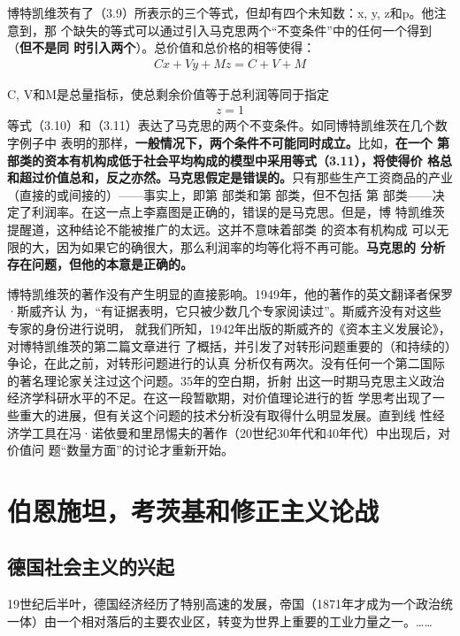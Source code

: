 博特凯维茨有了（3.9）所表示的三个等式，但却有四个未知数：x, y, z和p。他注意到，那
个缺失的等式可以通过引入马克思两个“不变条件”中的任何一个得到（\textbf{但不是同
  时引入两个}）。总价值和总价格的相等使得：
\begin{gather}
  Cx + Vy + Mz = C+V+M
\end{gather}

C, V和M是总量指标，使总剩余价值等于总利润等同于指定
\begin{gather}
  z = 1
\end{gather}
等式（3.10）和（3.11）表达了马克思的两个不变条件。如同博特凯维茨在几个数字例子中
表明的那样，\textbf{一般情况下，两个条件不可能同时成立。}比如，\textbf{在一个
  第 部类的资本有机构成低于社会平均构成的模型中采用等式（3.11），将使得价
  格总和超过价值总和，反之亦然。马克思假定是错误的。}只有那些生产工资商品的产业
（直接的或间接的）——事实上，即第 部类和第 部类，但不包括
第 部类——决定了利润率。在这一点上李嘉图是正确的，错误的是马克思。但是，博
特凯维茨提醒道，这种结论不能被推广的太远。这并不意味着部类 的资本有机构成
可以无限的大，因为如果它的确很大，那么利润率的均等化将不再可能。\textbf{马克思的
  分析存在问题，但他的本意是正确的。}

博特凯维茨的著作没有产生明显的直接影响。1949年，他的著作的英文翻译者保罗·斯威齐认
为，“有证据表明，它只被少数几个专家阅读过”。斯威齐没有对这些专家的身份进行说明，
就我们所知，1942年出版的斯威齐的《资本主义发展论》，对博特凯维茨的第二篇文章进行
了概括，并引发了对转形问题重要的（和持续的）争论，在此之前，对转形问题进行的认真
分析仅有两次。没有任何一个第二国际的著名理论家关注过这个问题。35年的空白期，折射
出这一时期马克思主义政治经济学科研水平的不足。在这一段暂歇期，对价值理论进行的哲
学思考出现了一些重大的进展，但有关这个问题的技术分析没有取得什么明显发展。直到线
性经济学工具在冯·诺依曼和里昂惕夫的著作（20世纪30年代和40年代）中出现后，对价值问
题“数量方面”的讨论才重新开始。

\chapter{伯恩施坦，考茨基和修正主义论战}

\section{德国社会主义的兴起}
19世纪后半叶，德国经济经历了特别高速的发展，帝国（1871年才成为一个政治统一体）由一个相对落后的主要农业区，转变为世界上重要的工业力量之一。……


